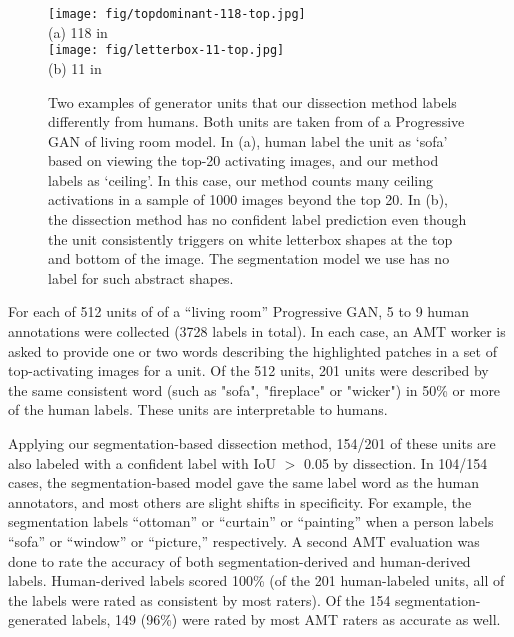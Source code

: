 \documentclass{article} %
\begin{document}
\begin{figure}[t]
\centering
\texttt{[image: fig/topdominant-118-top.jpg]} \\
(a) \unit{118} in  \\
\vspace{3pt}
\texttt{[image: fig/letterbox-11-top.jpg]} \\
(b) \unit{11} in  
\vspace{-3pt}
\caption{Two examples of generator units that our dissection method labels differently from humans.  Both units are taken from  of a Progressive GAN of living room model.  In (a), human label the unit as `sofa' based on viewing the top-20 activating images, and our method labels as `ceiling'.  In this case, our method counts many ceiling activations in a sample of 1000 images beyond the top 20.  In (b),  the dissection method has no confident label prediction even though the unit consistently triggers on white letterbox shapes at the top and bottom of the image.  The segmentation model we use has no label for such abstract shapes.}
\vspace{-10pt}
\end{figure}
For each of 512 units of  of a ``living room'' Progressive GAN,  5 to 9 human annotations were collected (3728 labels in total). In each case, an AMT worker is asked to provide one or two words describing the highlighted patches in a set of top-activating images for a unit.  Of the 512 units, 201 units were described by the same consistent word (such as "sofa", "fireplace" or "wicker") in 50\% or more of the human labels.  These units are interpretable to humans.

Applying our segmentation-based dissection method, 154/201 of these units are also labeled with a confident label with IoU $>$ 0.05 by dissection.  In 104/154 cases, the segmentation-based model gave the same label word as the human annotators, and most others are slight shifts in specificity. For example, the segmentation labels ``ottoman'' or ``curtain'' or ``painting'' when a person labels ``sofa'' or ``window'' or ``picture,'' respectively.  A second AMT evaluation was done to rate the accuracy of both segmentation-derived and human-derived labels.  Human-derived labels scored 100\% (of the 201 human-labeled units, all of the labels were rated as consistent by most raters).  Of the 154 segmentation-generated labels, 149 (96\%) were rated by most AMT raters as accurate as well.
\end{document}
